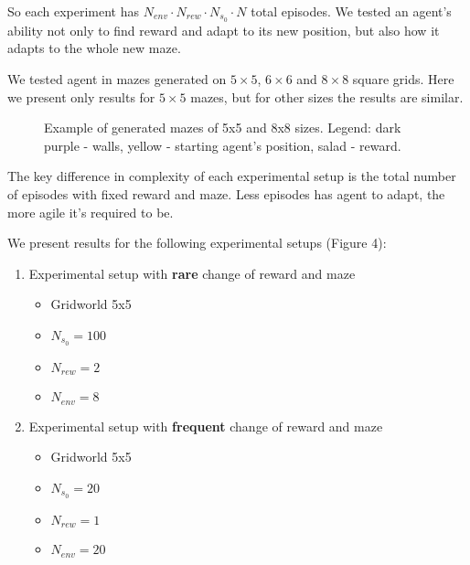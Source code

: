 \documentclass[runningheads]{llncs}
\begin{document}
So each experiment has $N_{env} \cdot N_{rew} \cdot N_{s_0} \cdot N$ total episodes. We tested an agent's ability not only to find reward and adapt to its new position, but also how it adapts to the whole new maze.

We tested agent in mazes generated on $5 \times 5$, $6 \times 6$ and $8 \times 8$ square grids. Here we present only results for $5 \times 5$ mazes, but for other sizes the results are similar.

\begin{figure}
  \centering
  \begin{minipage}{.49\linewidth}
    
  \end{minipage}
  \begin{minipage}{.49\linewidth}
    
  \end{minipage}
  \caption{Example of generated mazes of 5x5 and 8x8 sizes. Legend: dark purple - walls, yellow - starting agent's position, salad - reward.}
\end{figure}

The key difference in complexity of each experimental setup is the total number of episodes with fixed reward and maze. Less episodes has agent to adapt, the more agile it's required to be.

We present results for the following experimental setups (Figure 4):

\begin{enumerate}
  \item Experimental setup with \textbf{rare} change of reward and maze
  \begin{itemize}
    \item Gridworld 5x5
    \item $N_{s_0} = 100$
    \item $N_{rew} = 2$
    \item $N_{env} = 8$
  \end{itemize}

  \item Experimental setup with \textbf{frequent} change of reward and maze
  \begin{itemize}
    \item Gridworld 5x5
    \item $N_{s_0} = 20$
    \item $N_{rew} = 1$
    \item $N_{env} = 20$
  \end{itemize}
\end{enumerate}
\end{document}

